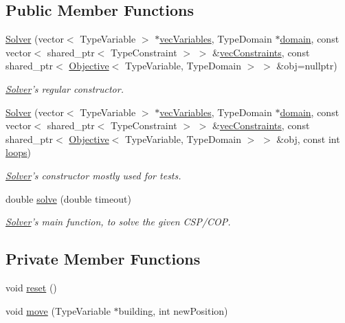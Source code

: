 \subsection*{Public Member Functions}
\begin{DoxyCompactItemize}
\item 
\hyperlink{classghost_1_1Solver_aee74bbdf00494dc209d4909bf9fcb544}{Solver} (vector$<$ Type\-Variable $>$ $\ast$\hyperlink{classghost_1_1Solver_a2d033a454234b2277aabdcc4d89eaba2}{vec\-Variables}, Type\-Domain $\ast$\hyperlink{classghost_1_1Solver_ad9292e9219261ba8058fec05b453c0c9}{domain}, const vector$<$ shared\-\_\-ptr$<$ Type\-Constraint $>$ $>$ \&\hyperlink{classghost_1_1Solver_a170746edcfb777b12978444c2ab3962e}{vec\-Constraints}, const shared\-\_\-ptr$<$ \hyperlink{classghost_1_1Objective}{Objective}$<$ Type\-Variable, Type\-Domain $>$ $>$ \&obj=nullptr)
\begin{DoxyCompactList}\small\item\em \hyperlink{classghost_1_1Solver}{Solver}'s regular constructor. \end{DoxyCompactList}\item 
\hyperlink{classghost_1_1Solver_a512335329b22a91700bdfa7870f053e9}{Solver} (vector$<$ Type\-Variable $>$ $\ast$\hyperlink{classghost_1_1Solver_a2d033a454234b2277aabdcc4d89eaba2}{vec\-Variables}, Type\-Domain $\ast$\hyperlink{classghost_1_1Solver_ad9292e9219261ba8058fec05b453c0c9}{domain}, const vector$<$ shared\-\_\-ptr$<$ Type\-Constraint $>$ $>$ \&\hyperlink{classghost_1_1Solver_a170746edcfb777b12978444c2ab3962e}{vec\-Constraints}, const shared\-\_\-ptr$<$ \hyperlink{classghost_1_1Objective}{Objective}$<$ Type\-Variable, Type\-Domain $>$ $>$ \&obj, const int \hyperlink{classghost_1_1Solver_aa6a77e14862a9be467e6c6c76124b526}{loops})
\begin{DoxyCompactList}\small\item\em \hyperlink{classghost_1_1Solver}{Solver}'s constructor mostly used for tests. \end{DoxyCompactList}\item 
double \hyperlink{classghost_1_1Solver_a30dd2769fb30ac42d231d2c305dcdf13}{solve} (double timeout)
\begin{DoxyCompactList}\small\item\em \hyperlink{classghost_1_1Solver}{Solver}'s main function, to solve the given C\-S\-P/\-C\-O\-P. \end{DoxyCompactList}\end{DoxyCompactItemize}
\subsection*{Private Member Functions}
\begin{DoxyCompactItemize}
\item 
void \hyperlink{classghost_1_1Solver_a43db35b71a3e494ce208622cc45cbeb0}{reset} ()
\item 
void \hyperlink{classghost_1_1Solver_af1176494b45226e87edefa0b39babf62}{move} (Type\-Variable $\ast$building, int new\-Position)
\end{DoxyCompactItemize}
